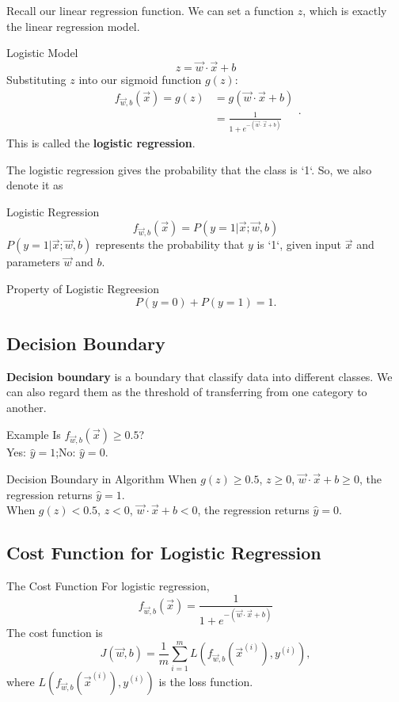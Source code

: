 \documentclass[12pt,a4paper]{article}
\begin{document}
Recall our linear regression function. We can set a function $z$, which is exactly the linear regression model. 
\begin{thmbox}{Logistic Model}
	$$z=\vec{w}\cdot\vec{x}+b$$
	Substituting $z$ into our sigmoid function $g(z)$: 
	$$\begin{aligned}
		f_{\vec{w},b}(\vec{x})=g(z)&=g(\vec{w}\cdot\vec{x}+b)\\
		&=\frac{1}{1+e^{-(\vec{w}\cdot\vec{x}+b)}}
		\end{aligned}.$$
	This is called the \textbf{logistic regression}. 
\end{thmbox}

The logistic regression gives the probability that the class is `1`.  So, we also denote it as 
\begin{thmbox}{Logistic Regression}
	$$f_{\vec{w},b}(\vec{x})=P(y=1|\vec{x};\vec{w},b)$$
	$P(y=1|\vec{x};\vec{w},b)$ represents the probability that $y$ is `1`, given input $\vec{x}$ and parameters $\vec{w}$ and $b$. 
\end{thmbox}
\begin{thmbox}{Property of Logistic Regreesion}
	$$P(y=0)+P(y=1)=1.$$
\end{thmbox}

\subsection{Decision Boundary}
\quad \textbf{Decision boundary} is a boundary that classify data into different classes. We can also regard them as the threshold of transferring from one category to another. 
\begin{egbox}{Example}
	Is $f_{\vec{w},b}(\vec{x})\geq0.5$? \\
	Yes: $\hat{y}=1$;\quad\quad\quad\quad No: $\hat{y}=0$. 
\end{egbox}
\begin{rmkbox}{Decision Boundary in Algorithm}
	When $g(z)\geq0.5$, $z\geq0$, $\vec{w}\cdot\vec{x}+b\geq0$, the regression returns $\hat{y}=1$.\\
	When $g(z)<0.5$, $z<0$, $\vec{w}\cdot\vec{x}+b<0$, the regression returns $\hat{y}=0$.
\end{rmkbox}

\subsection{Cost Function for Logistic Regression}
\begin{thmbox}{The Cost Function}
	For logistic regression, 
	$$f_{\vec{w},b}(\vec{x})=\frac{1}{1+e^{-(\vec{w}\cdot\vec{x}+b)}}$$
	The cost function is 
	$$J(\vec{w},b)=\frac{1}{m}\sum_{i=1}^mL\left(f_{\vec{w},b}(\vec{x}^{(i)}),y^{(i)}\right),$$
	where $L\left(f_{\vec{w},b}(\vec{x}^{(i)}),y^{(i)}\right)$ is the loss function. 
\end{thmbox}
\end{document}
